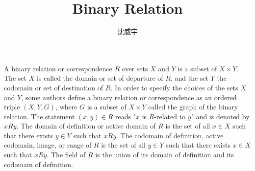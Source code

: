\documentclass[a4paper,12pt]{article}
\begin{document}
\title{Binary Relation}
\author{沈威宇}
\date{\temtoday}
\titletocdoc
{}
A binary relation or correspondence $R$ over sets $X$ and $Y$ is a subset of $X\times Y$. The set $X$ is called the domain or set of departure of $R$, and the set $Y$ the codomain or set of destination of $R$. In order to specify the choices of the sets $X$ and $Y$, some authors define a binary relation or correspondence as an ordered triple $(X,Y,G)$, where $G$ is a subset of $X\times Y$ called the graph of the binary relation. The statement $(x,y)\in R$ reads "$x$ is $R$-related to $y$" and is denoted by $xRy$. The domain of definition or active domain of $R$ is the set of all $x\in X$ such that there exists $y\in Y$ such that $xRy$. The codomain of definition, active codomain, image, or range of $R$ is the set of all $y\in Y$ such that there exists $x\in X$ such that $xRy$. The field of $R$ is the union of its domain of definition and its codomain of definition.
\end{document}
